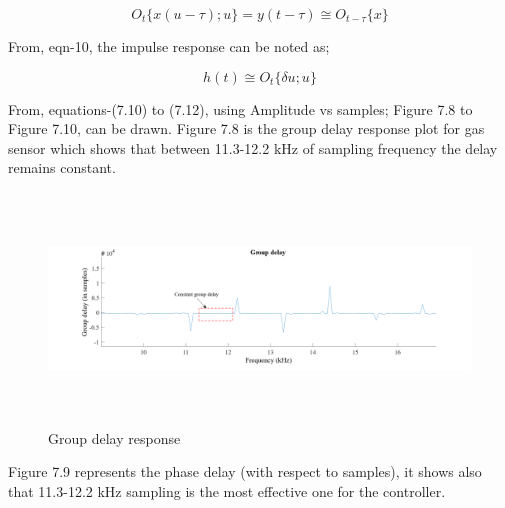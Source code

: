 \begin{enumerate}[label=\roman*]
\begin{equation}\tag{7.11}
O_t\{x(u-\tau);u\}=y(t-\tau)\cong O_{t-\tau}\{x\}
\end{equation}
\begin{justify}
From, eqn-10, the impulse response can be noted as;
\end{justify}\par


\begin{equation}\tag{7.12}
h ( t ) \cong O_{t} \{  \delta u; u \}
\end{equation}
\begin{justify}
From, equations-(7.10) to (7.12), using Amplitude vs samples; Figure 7.8 to Figure 7.10, can be drawn. Figure 7.8 is the group delay response plot for gas sensor which shows that between 11.3-12.2 kHz of sampling frequency the delay remains constant.
\end{justify}\par




\begin{figure}[H]
	\begin{Center}
		\includegraphics[width=6.44in,height=2.42in]{22}
		\caption{Group delay response}
		\label{fig:_8_Group_delay_response}
	\end{Center}
\end{figure}



\par

\par

\begin{justify}
Figure 7.9 represents the phase delay (with respect to samples), it shows also that 11.3-12.2 kHz sampling is the most effective one for the controller.
\end{justify}\par




\end{enumerate}
